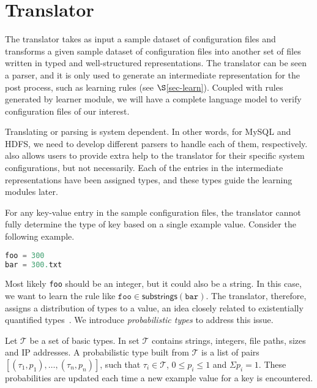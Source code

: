 
\section{Translator}
\label{sec-trans}

The translator takes as input a sample dataset of configuration files and transforms a given sample
dataset of configuration files into another set of files written in
typed and well-structured representations.
The translator can be seen a parser, and it is only
used to generate an intermediate representation for the post
process, such as learning rules (see $\S$\ref{sec-learn}).
Coupled with rules generated by learner module,
we will have a complete language model to verify configuration files
of our interest.

Translating or parsing is system dependent. In other words, for MySQL
and HDFS, we need to develop different parsers to handle each of them,
respectively. \app also allows users to 
provide extra help to the translator
for their specific system configurations,
but not necessarily. 
Each of the entries in the intermediate representations
have been assigned types, and these types guide the learning
modules later.


For any key-value entry in the sample configuration files,
the translator cannot fully determine the type of key 
based on a single example value.
Consider the following example.

\begin{lstlisting}[language=C, xleftmargin=.01\textwidth]
foo = 300
bar = 300.txt
\end{lstlisting} 

Most likely {\tt foo} should be an integer, but it could also be a string.
In this case, we want to learn the rule like 
$ \texttt{foo} \in \textsf{substrings}(\texttt{bar})$. 
The translator, therefore, assigns a distribution of types 
to a value, an idea closely related to existentially quantified 
types~\cite{Launchbury93lazyfunctional}. 
We introduce {\em probabilistic types} to address this issue.

Let $\mathcal{T}$ be a set of basic types. 
In \app set $\mathcal{T}$ contains strings, integers, file paths, 
sizes and IP addresses. 
A probabilistic type built from $\mathcal{T}$ is a list of pairs 
$[(\tau_1, p_1),\ldots,(\tau_n, p_n)]$,
such that $\tau_i \in \mathcal{T}$, $0 \le p_i \le 1$ 
and $\Sigma p_i = 1$. 
These probabilities are updated each time a new example value 
for a key is encountered.

